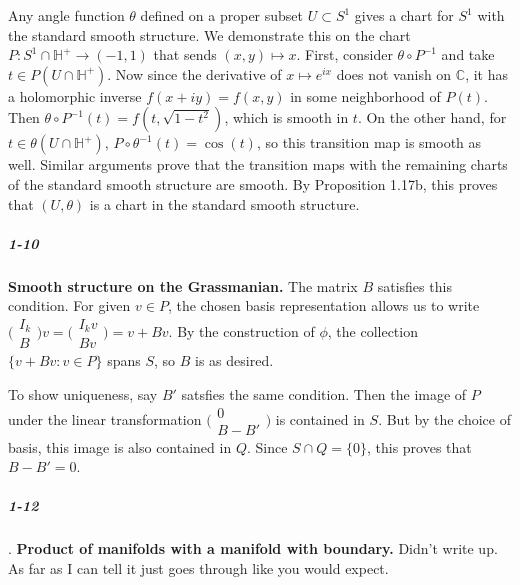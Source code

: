 \documentclass[10pt,letter]{article}
\begin{document}
Any angle function $\theta$ defined on a proper subset $U \subset S^1$ gives a chart for $S^1$ with the standard smooth structure. We demonstrate this on the chart $P: S^1 \cap \mathbb{H}^+ \rightarrow (-1,1)$ that sends $(x,y) \mapsto x$. First, consider $\theta \circ P^{-1}$ and take $t \in P(U \cap \mathbb{H}^+)$. Now since the derivative of $x \mapsto e^{ix}$ does not vanish on $\mathbb{C}$, it has a holomorphic inverse $f(x+iy) = f(x,y)$ in some neighborhood of $P(t)$. Then $\theta \circ P^{-1}(t) = f(t,\sqrt{1-t^2})$, which is smooth in $t$. On the other hand, for $t \in \theta(U \cap \mathbb{H}^+)$, $P \circ \theta^{-1}(t) = \cos(t)$, so this transition map is smooth as well. Similar arguments prove that the transition maps with the remaining charts of the standard smooth structure are smooth. By Proposition 1.17b, this proves that $(U, \theta)$ is a chart in the standard smooth structure. 

\subparagraph{1-10} \textbf{Smooth structure on the Grassmanian.} The matrix $B$ satisfies this condition. For given $v \in P$, the chosen basis representation allows us to write $\bigg( \begin{array}{c} I_k \\ B \end{array} \bigg)v = \bigg( \begin{array}{c} I_kv \\ Bv \end{array} \bigg) = v + Bv$. By the construction of $\phi$, the collection $\lbrace v + Bv: v \in P \rbrace$ spans $S$, so $B$ is as desired.

To show uniqueness, say $B'$ satsfies the same condition. Then the image of $P$ under the linear transformation $\bigg( \begin{array}{c} 0 \\ B-B' \end{array} \bigg)$ is contained in $S$. But by the choice of basis, this image is also contained in $Q$. Since $S \cap Q = \lbrace 0 \rbrace$, this proves that $B-B' = 0$. 

\subparagraph{1-12}. \textbf{Product of manifolds with a manifold with boundary.} Didn't write up. As far as I can tell it just goes through like you would expect. 
\end{document}
